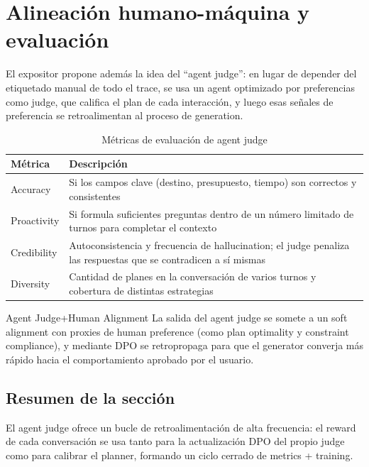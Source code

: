 \section{Alineación humano-máquina y evaluación}

El expositor propone además la idea del ``agent judge'': en lugar de depender del etiquetado manual de todo el trace, se usa un agent optimizado por preferencias como judge, que califica el plan de cada interacción, y luego esas señales de preferencia se retroalimentan al proceso de generation.
\begin{table}[H]
\centering
\begin{tabular}{lp{6cm}}
\toprule
Métrica & Descripción \\
\midrule
Accuracy & Si los campos clave (destino, presupuesto, tiempo) son correctos y consistentes \\
Proactivity & Si formula suficientes preguntas dentro de un número limitado de turnos para completar el contexto \\
Credibility & Autoconsistencia y frecuencia de hallucination; el judge penaliza las respuestas que se contradicen a sí mismas \\
Diversity & Cantidad de planes en la conversación de varios turnos y cobertura de distintas estrategias \\
\bottomrule
\end{tabular}
\caption{Métricas de evaluación de agent judge}
\end{table}

\begin{knowledgebox}{Agent Judge+Human Alignment}
La salida del agent judge se somete a un soft alignment con proxies de human preference (como plan optimality y constraint compliance), y mediante DPO se retropropaga para que el generator converja más rápido hacia el comportamiento aprobado por el usuario.
\end{knowledgebox}

\subsection{Resumen de la sección}

El agent judge ofrece un bucle de retroalimentación de alta frecuencia: el reward de cada conversación se usa tanto para la actualización DPO del propio judge como para calibrar el planner, formando un ciclo cerrado de metrics + training.

